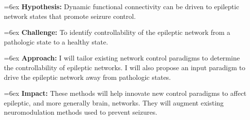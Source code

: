 \hangindent=6ex
\textbf{Hypothesis:} Dynamic functional connectivity can be driven to epileptic network states that promote seizure control.

\hangindent=6ex
\textbf{Challenge:} To identify controllability of the epileptic network from a pathologic state to a healthy state.

\hangindent=6ex
\textbf{Approach:} I will tailor existing network control paradigms to determine the controllability of epileptic networks. I will also propose an input paradigm to drive the epileptic network away from pathologic states.

\hangindent=6ex
\textbf{Impact:} These methods will help innovate new control paradigms to affect epileptic, and more generally brain, networks. They will augment existing neuromodulation methods used to prevent seizures.
